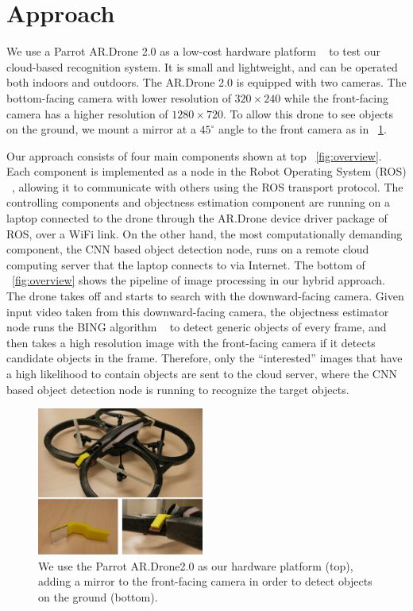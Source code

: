 \section{Approach}
We use a Parrot AR.Drone 2.0 as a low-cost hardware platform ~\cite{c29}
to test our cloud-based recognition system. It is small and lightweight, and can be operated both indoors and outdoors.
The AR.Drone 2.0 is equipped with two cameras. 
The bottom-facing camera with lower resolution of $320 \times 240$ while the front-facing camera has a higher resolution of $1280 \times 720$. 
To allow this drone to see objects on the ground, we mount a mirror at a $45^{\circ}$ angle to the front camera as in ~\ref{fig:mirror}.

Our approach consists of four main components shown at top ~\ref{fig:overview}. Each component is implemented as a node in the Robot Operating System (ROS) ~\cite{c30}, allowing it to communicate with others using the ROS transport protocol.
The controlling components and objectness estimation component are running on a laptop connected to the drone through the AR.Drone device driver package of ROS, over a WiFi link. On the other hand, the most computationally demanding component, the CNN based object detection node, runs on a remote cloud computing server that the laptop connects to via Internet.
The bottom of ~\ref{fig:overview} shows the pipeline of image processing in our hybrid approach. 
The drone takes off and starts to search with the downward-facing camera. 
Given input video taken from this downward-facing camera, the objectness estimator node runs the BING algorithm ~\cite{c28} to detect generic objects of every frame, and then takes a high resolution image with the front-facing camera if it detects candidate objects in the frame.
Therefore, only the ``interested'' images that have a high likelihood to contain objects are sent to the cloud server, where the CNN based object detection node is running to recognize the target objects.

\begin{figure}[t]
 \centering
    \includegraphics[width=0.489\textwidth, natwidth=901, natheight=861]{figures/chapter2/hw_platform2.jpg}
 \caption{We use the Parrot AR.Drone2.0 as our hardware platform (top), adding a mirror to the front-facing camera in order to detect objects on the ground (bottom).}
 \label{fig:mirror}
\end{figure}

